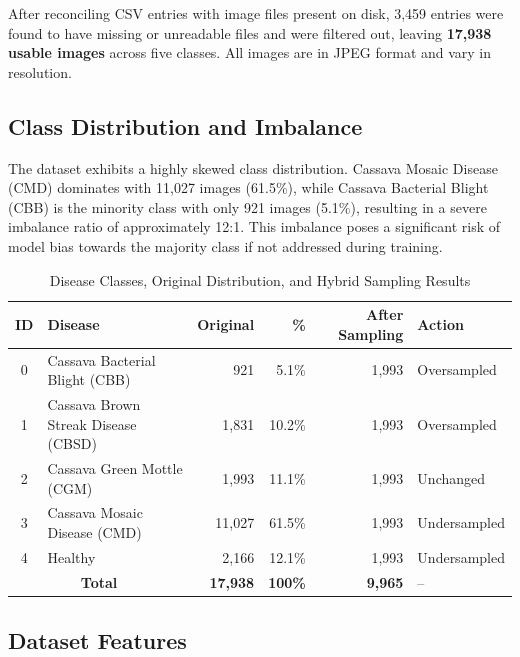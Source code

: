 \documentclass[12pt,a4paper]{article}
\begin{document}
After reconciling CSV entries with image files present on disk, 3,459 entries were found to have missing or unreadable files and were filtered out, leaving \textbf{17,938 usable images} across five classes. All images are in JPEG format and vary in resolution.

\subsection{Class Distribution and Imbalance}

The dataset exhibits a highly skewed class distribution. Cassava Mosaic Disease (CMD) dominates with 11,027 images (61.5\%), while Cassava Bacterial Blight (CBB) is the minority class with only 921 images (5.1\%), resulting in a severe imbalance ratio of approximately 12:1. This imbalance poses a significant risk of model bias towards the majority class if not addressed during training.

\begin{table}[H]
\centering
\caption{Disease Classes, Original Distribution, and Hybrid Sampling Results}
\label{tab:classes_sampling}
\begin{tabular}{|c|l|r|r|r|l|}
    \hline
    \textbf{ID} & \textbf{Disease} & \textbf{Original} & \textbf{\%} & \textbf{After Sampling} & \textbf{Action} \\
    \hline
    0 & Cassava Bacterial Blight (CBB)      &    921 &  5.1\% & 1,993 & Oversampled \\
    \hline
    1 & Cassava Brown Streak Disease (CBSD) &  1,831 & 10.2\% & 1,993 & Oversampled \\
    \hline
    2 & Cassava Green Mottle (CGM)          &  1,993 & 11.1\% & 1,993 & Unchanged   \\
    \hline
    3 & Cassava Mosaic Disease (CMD)        & 11,027 & 61.5\% & 1,993 & Undersampled \\
    \hline
    4 & Healthy                             &  2,166 & 12.1\% & 1,993 & Undersampled \\
    \hline
    \multicolumn{2}{|c|}{\textbf{Total}} & \textbf{17,938} & \textbf{100\%} & \textbf{9,965} & -- \\
    \hline
\end{tabular}
\end{table}

\subsection{Dataset Features}
\end{document}
